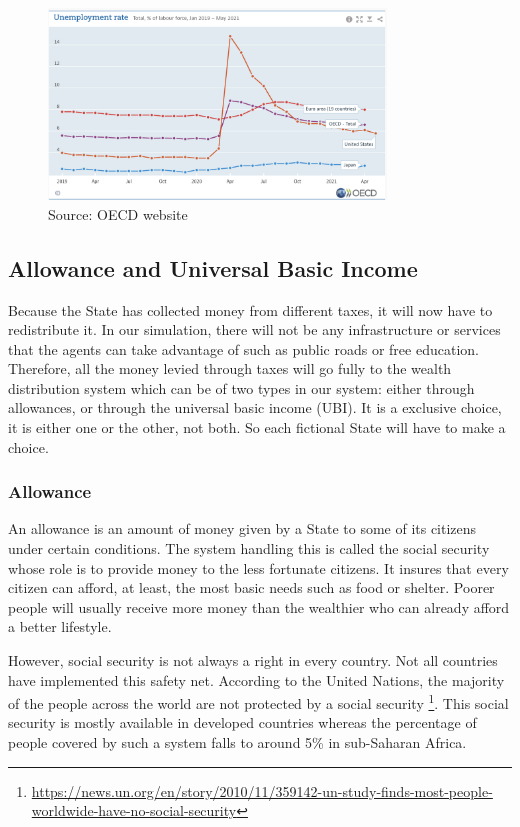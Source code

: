     \begin{figure}[H]
        \centering
        \includegraphics[width=0.8\textwidth]{img/unemployment_OECD.png}
        \caption{Source: OECD website}
        \label{fig:unemployment_oecd}
    \end{figure}



\subsection{Allowance and Universal Basic Income}

Because the State has collected money from different taxes, it will now have to redistribute it. In our simulation, there will not be any infrastructure or services that the agents can take advantage of such as public roads or free education. Therefore, all the money levied through taxes will go fully to the wealth distribution system which can be of two types in our system: either through allowances, or through the universal basic income (UBI). It is a exclusive choice, it is either one or the other, not both. So each fictional State will have to make a choice.

    \subsubsection{Allowance}
    
    An allowance is an amount of money given by a State to some of its citizens under certain conditions. The system handling this is called the social security whose role is to provide money to the less fortunate citizens. It insures that every citizen can afford, at least, the most basic needs such as food or shelter. Poorer people will usually receive more money than the wealthier who can already afford a better lifestyle.
    
    However, social security is not always a right in every country. Not all countries have implemented this safety net. According to the United Nations, the majority of the people across the world are not protected by a social security \footnote{\url{https://news.un.org/en/story/2010/11/359142-un-study-finds-most-people-worldwide-have-no-social-security}}. This social security is mostly available in developed countries whereas the percentage of people covered by such a system falls to around 5\% in sub-Saharan Africa.
    
